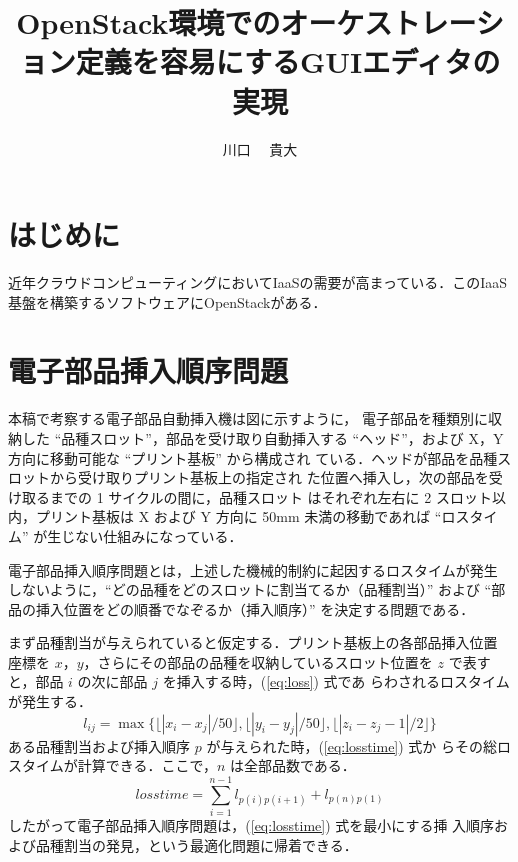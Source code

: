 \documentclass[a4j]{jarticle}
\title{OpenStack環境でのオーケストレーション定義を容易にするGUIエディタの実現}
\author{川口 ~~貴大}
\begin{document}
\begin{Abstract}
 
 \section{はじめに}
 近年クラウドコンピューティングにおいてIaaSの需要が高まっている．このIaaS基盤を構築するソフトウェアにOpenStackがある．
 \section{電子部品挿入順序問題}
 本稿で考察する電子部品自動挿入機は図に示すように，
 電子部品を種類別に収納した ``品種スロット''，部品を受け取り自動挿入する %
 ``ヘッド''，および X，Y 方向に移動可能な ``プリント基板'' から構成され
 ている．ヘッドが部品を品種スロットから受け取りプリント基板上の指定され
 た位置へ挿入し，次の部品を受け取るまでの 1 サイクルの間に，品種スロット
 はそれぞれ左右に 2 スロット以内，プリント基板は X および Y 方向に 50mm %
 未満の移動であれば ``ロスタイム'' が生じない仕組みになっている．

 
 電子部品挿入順序問題とは，上述した機械的制約に起因するロスタイムが発生
 しないように，``どの品種をどのスロットに割当てるか（品種割当）'' および %
 ``部品の挿入位置をどの順番でなぞるか（挿入順序）'' を決定する問題である．

 まず品種割当が与えられていると仮定する．プリント基板上の各部品挿入位置
 座標を $x$，$y$，さらにその部品の品種を収納しているスロット位置を $z$ %
 で表すと，部品 $i$ の次に部品 $j$ を挿入する時，(\ref{eq:loss}) 式であ
 らわされるロスタイムが発生する．
 \begin{equation}
  l_{ij} = \max\{
   \lfloor |x_i - x_j| / 50 \rfloor,
   \lfloor |y_i - y_j| / 50 \rfloor,
   \lfloor |z_i - z_j - 1| / 2 \rfloor
   \}
   \label{eq:loss}
 \end{equation}
 ある品種割当および挿入順序 $p$ が与えられた時，(\ref{eq:losstime}) 式か
 らその総ロスタイムが計算できる．ここで，$n$ は全部品数である．
 \begin{equation}
  losstime = \sum_{i = 1}^{n - 1}l_{p(i) p(i + 1)} + l_{p(n) p(1)}
   \label{eq:losstime}
 \end{equation}
 したがって電子部品挿入順序問題は，(\ref{eq:losstime}) 式を最小にする挿
 入順序および品種割当の発見，という最適化問題に帰着できる．


\end{Abstract}
\end{document}
